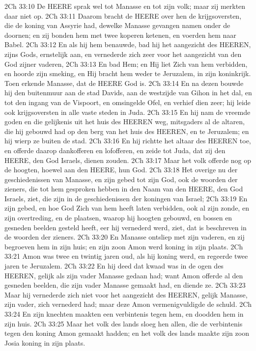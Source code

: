 2Ch 33:10  De HEERE sprak wel tot Manasse en tot zijn volk; maar zij merkten daar niet op.
2Ch 33:11  Daarom bracht de HEERE over hen de krijgsoversten, die de koning van Assyrie had, dewelke Manasse gevangen namen onder de doornen; en zij bonden hem met twee koperen ketenen, en voerden hem naar Babel.
2Ch 33:12  En als hij hem benauwde, bad hij het aangezicht des HEEREN, zijns Gods, ernstelijk aan, en vernederde zich zeer voor het aangezicht van den God zijner vaderen,
2Ch 33:13  En bad Hem; en Hij liet Zich van hem verbidden, en hoorde zijn smeking, en Hij bracht hem weder te Jeruzalem, in zijn koninkrijk. Toen erkende Manasse, dat de HEERE God is.
2Ch 33:14  En na dezen bouwde hij den buitenmuur aan de stad Davids, aan de westzijde van Gihon in het dal, en tot den ingang van de Vispoort, en omsingelde Ofel, en verhief dien zeer; hij leide ook krijgsoversten in alle vaste steden in Juda.
2Ch 33:15  En hij nam de vreemde goden en die gelijkenis uit het huis des HEEREN weg, mitsgaders al de altaren, die hij gebouwd had op den berg van het huis des HEEREN, en te Jeruzalem; en hij wierp ze buiten de stad.
2Ch 33:16  En hij richtte het altaar des HEEREN toe, en offerde daarop dankofferen en lofofferen, en zeide tot Juda, dat zij den HEERE, den God Israels, dienen zouden.
2Ch 33:17  Maar het volk offerde nog op de hoogten, hoewel aan den HEERE, hun God.
2Ch 33:18  Het overige nu der geschiedenissen van Manasse, en zijn gebed tot zijn God, ook de woorden der zieners, die tot hem gesproken hebben in den Naam van den HEERE, den God Israels, ziet, die zijn in de geschiedenissen der koningen van Israel;
2Ch 33:19  En zijn gebed, en hoe God Zich van hem heeft laten verbidden, ook al zijn zonde, en zijn overtreding, en de plaatsen, waarop hij hoogten gebouwd, en bossen en gesneden beelden gesteld heeft, eer hij vernederd werd, ziet, dat is beschreven in de woorden der zieners.
2Ch 33:20  En Manasse ontsliep met zijn vaderen, en zij begroeven hem in zijn huis; en zijn zoon Amon werd koning in zijn plaats.
2Ch 33:21  Amon was twee en twintig jaren oud, als hij koning werd, en regeerde twee jaren te Jeruzalem.
2Ch 33:22  En hij deed dat kwaad was in de ogen des HEEREN, gelijk als zijn vader Manasse gedaan had; want Amon offerde al den gesneden beelden, die zijn vader Manasse gemaakt had, en diende ze.
2Ch 33:23  Maar hij vernederde zich niet voor het aangezicht des HEEREN, gelijk Manasse, zijn vader, zich vernederd had; maar deze Amon vermenigvuldigde de schuld.
2Ch 33:24  En zijn knechten maakten een verbintenis tegen hem, en doodden hem in zijn huis.
2Ch 33:25  Maar het volk des lands sloeg hen allen, die de verbintenis tegen den koning Amon gemaakt hadden; en het volk des lands maakte zijn zoon Josia koning in zijn plaats.
